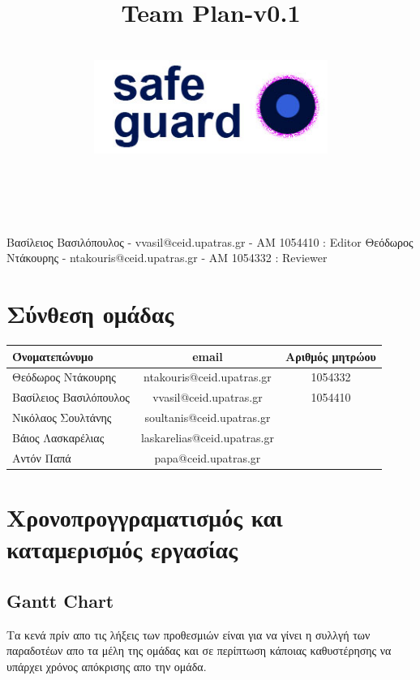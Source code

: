 \documentclass{article}
\title{Team Plan-v0.1}
\author{\\
\includegraphics[width=3in]{safeguard}\\[1ex]\\\\
}
\begin{document}
\maketitle

\newpage

Βασίλειος Βασιλόπουλος - vvasil@ceid.upatras.gr - ΑΜ 1054410 : Editor
Θεόδωρος Ντάκουρης - ntakouris@ceid.upatras.gr - ΑΜ 1054332 : Reviewer

\renewcommand{\contentsname}{Περιεχόμενα}
\tableofcontents


\section{Σύνθεση ομάδας}
\begin{tabular}{|l|c|c|}
\hline
Όνοματεπώνυμο & email & Αριθμός μητρώου  \\
\hline
Θεόδωρος Ντάκουρης & ntakouris@ceid.upatras.gr & 1054332 \\
Βασίλειος Βασιλόπουλος & vvasil@ceid.upatras.gr &  1054410\\
Νικόλαος Σουλτάνης & soultanis@ceid.upatras.gr &  \\
Βάιος Λασκαρέλιας & laskarelias@ceid.upatras.gr & \\
Αντόν Παπά & papa@ceid.upatras.gr & \\
\hline
\end{tabular}

\section{Χρονοπρογγραματισμός και καταμερισμός εργασίας}
\subsection{Gantt Chart}
Τα κενά πρίν απο τις λήξεις των προθεσμιών είναι για να γίνει η συλλγή των παραδοτέων απο τα μέλη της ομάδας και σε περίπτωση κάποιας καθυστέρησης να υπάρχει χρόνος απόκρισης απο την ομάδα.
\begin{center}
\end{center}
\end{document}
